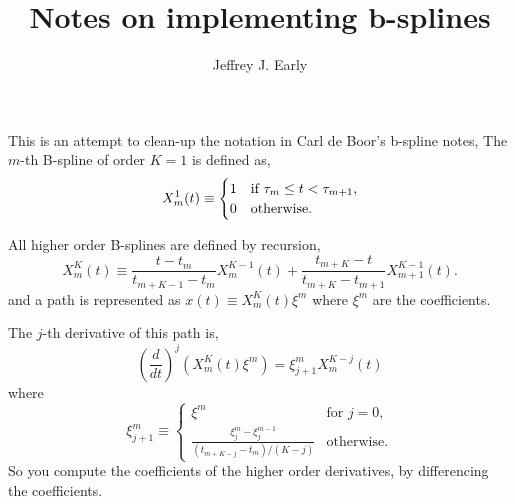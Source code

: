 \documentclass[11pt, oneside]{article}   	%
\title{Notes on implementing b-splines}
\author{Jeffrey J. Early}
\begin{document}
\maketitle

This is an attempt to clean-up the notation in Carl de Boor's b-spline notes,
The $m$-th B-spline of order $K=1$ is defined as,
\begin{equation}
X^1_m(t) \equiv \begin{cases}
1      & \text{if $ \tau_m \leq t < \tau_{m+1}$}, \\
0     & \text{otherwise}.
\end{cases}
\end{equation}

All higher order B-splines are defined by recursion,
\begin{equation}
X^K_m(t) \equiv \frac{t - t_m}{t_{m+K-1} - t_m} X^{K-1}_m(t) + \frac{t_{m+K}-t}{t_{m+K} - t_{m+1}} X^{K-1}_{m+1}(t).
\end{equation}
and a path is represented as $x(t) \equiv  X^K_m(t) \xi^m$ where $\xi^m$ are the coefficients.

The $j$-th derivative of this path is,
\begin{equation}
\left(\frac{d}{dt}\right)^j \left(X^K_m(t) \xi^m\right) = \xi_{j+1}^m X^{K-j}_m(t)
\end{equation}
where 
\begin{equation}
\xi_{j+1}^m \equiv \begin{cases}
\xi^m      & \text{for $j=0$}, \\
\frac{\xi_j^m - \xi_j^{m-1}}{ (t_{m+K-j} - t_m)/(K-j) }    & \text{otherwise}.
\end{cases}
\end{equation}
So you compute the coefficients of the higher order derivatives, by differencing the coefficients.
\end{document}
